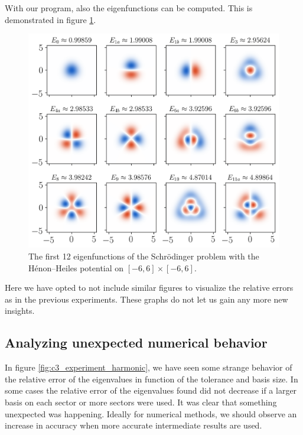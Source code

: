 With our program, also the eigenfunctions can be computed. This is demonstrated in figure \ref{fig:henon_heiles_eigenfunction}.
\begin{figure}
  \begin{center}
    \includegraphics[width=\linewidth]{img/chapter3/experiments/henon_heiles_eigenfunctions.png}
    \caption{\label{fig:henon_heiles_eigenfunction} The first 12 eigenfunctions of the Schrödinger problem with the Hénon--Heiles potential on $[-6, 6]\times[-6,6]$.}
  \end{center}
\end{figure}

Here we have opted to not include similar figures to visualize the relative errors as in the previous experiments. These graphs do not let us gain any more new insights.

\subsection{Analyzing unexpected numerical behavior}\label{sec:c3_conclusion_hypothesis}

In figure \ref{fig:c3_experiment_harmonic}, we have seen some strange behavior of the relative error of the eigenvalues in function of the tolerance and basis size. In some cases the relative error of the eigenvalues found did not decrease if a larger basis on each sector or more sectors were used. It was clear that something unexpected was happening. Ideally for numerical methods, we should observe an increase in accuracy when more accurate intermediate results are used.

